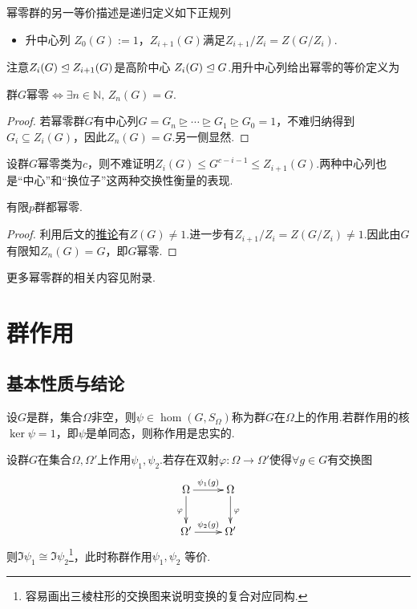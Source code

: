 幂零群的另一等价描述是递归定义如下正规列
\begin{itemize}
	\item {\heiti 升中心列} $Z_0(G):=1$，$Z_{i+1}(G)$满足$Z_{i+1}/Z_i=Z(G/Z_i)$.
\end{itemize}
注意$Z_i(G)\trianglelefteq Z_{i+1}(G)$是{\heiti 高阶中心} $Z_i(G)\trianglelefteq G$.用升中心列给出幂零的等价定义为
\begin{prop}
	群$G$幂零$\iff\exists n\in\mathbb{N},\,Z_n(G)=G$.
\end{prop}
\begin{proof}
	若幂零群$G$有中心列$G=G_n\trianglerighteq\cdots\trianglerighteq G_1\trianglerighteq G_0=1$，不难归纳得到$G_i\subseteq Z_i(G)$，因此$Z_n(G)=G$.另一侧显然.
\end{proof}
\begin{remark}
	设群$G$幂零类为$c$，则不难证明$Z_i(G)\le G^{c-i-1}\le Z_{i+1}(G)$.两种中心列也是“中心”和“换位子”这两种交换性衡量的表现.
\end{remark}
\begin{prop}
	有限$p$群都幂零.
\end{prop}
\begin{proof}
	利用后文的\hyperlink{cor:pGroupCenter}{推论}有$Z(G)\ne 1$.进一步有$Z_{i+1}/Z_i=Z(G/Z_i)\ne 1$.因此由$G$有限知$Z_n(G)=G$，即$G$幂零.
\end{proof}

更多幂零群的相关内容见附录.%

\section{群作用}
\subsection{基本性质与结论}
\begin{definition}
	设$G$是群，集合$\Omega$非空，则$\psi\in\hom(G,S_\Omega)$称为{\heiti 群$G$在$\Omega$上的作用}.若群作用的核$\ker\psi=1$，即$\psi$是单同态，则称作用是{\heiti 忠实的}.

	设群$G$在集合$\Omega,\Omega'$上作用$\psi_1,\psi_2$.若存在双射$\varphi\colon\Omega\to\Omega'$使得$\forall g\in G$有交换图
	\[
		\xymatrix{
			\Omega\ar[r]^{\psi_1(g)}\ar[d]_\varphi&\Omega\ar[d]^\varphi\\
			\Omega'\ar[r]^{\psi_2(g)}&\Omega'
		}
	\]
	则$\Im\psi_1\cong\Im\psi_2$\footnote{容易画出三棱柱形的交换图来说明变换的复合对应同构.}，此时称群作用$\psi_1,\psi_2$ {\heiti 等价}.
\end{definition}


